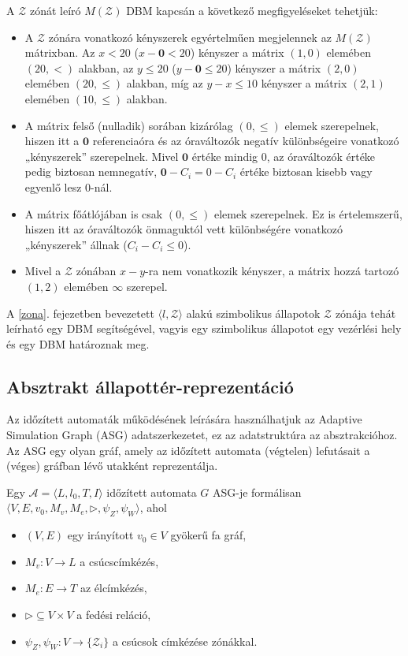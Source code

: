 A $\mathcal{Z}$ zónát leíró $M(\mathcal{Z})$ DBM kapcsán a következő megfigyeléseket tehetjük:
\begin{itemize}
    \item A $\mathcal{Z}$ zónára vonatkozó kényszerek egyértelműen megjelennek az $M(\mathcal{Z})$ mátrixban. Az $x < 20$ ($x - \textbf{0} < 20$) kényszer a mátrix $(1,0)$ elemében $(20,<)$ alakban, az $y \leq 20$ ($y - \textbf{0} \leq 20$) kényszer a mátrix $(2,0)$ elemében $(20,\leq)$ alakban, míg az $y-x \leq 10$ kényszer a mátrix $(2,1)$ elemében $(10,\leq)$ alakban.
    \item A mátrix felső (nulladik) sorában kizárólag $(0,\leq)$ elemek szerepelnek, hiszen itt a $\textbf{0}$ referenciaóra és az óraváltozók negatív különbségeire vonatkozó „kényszerek” szerepelnek. Mivel $\textbf{0}$ értéke mindig 0, az óraváltozók értéke pedig biztosan nemnegatív, $\textbf{0}-C_i = 0-C_i$ értéke biztosan kisebb vagy egyenlő lesz 0-nál.
    \item A mátrix főátlójában is csak $(0,\leq)$ elemek szerepelnek. Ez is értelemszerű, hiszen itt az óraváltozók önmaguktól vett különbségére vonatkozó „kényszerek” állnak ($C_i - C_i \leq 0$).
    \item Mivel a $\mathcal{Z}$ zónában $x-y$-ra nem vonatkozik kényszer, a mátrix hozzá tartozó $(1,2)$ elemében $\infty$ szerepel.
\end{itemize}

A \ref{zona}. fejezetben bevezetett $\langle l, \mathcal{Z} \rangle$ alakú szimbolikus állapotok $\mathcal{Z}$ zónája tehát leírható egy DBM segítségével, vagyis egy szimbolikus állapotot egy vezérlési hely és egy DBM határoznak meg.

\subsection{Absztrakt állapottér-reprezentáció}
Az időzített automaták működésének leírására használhatjuk az Adaptive Simulation Graph (ASG) \cite{spin2018} adatszerkezetet, ez az adatstruktúra az absztrakcióhoz. Az ASG egy olyan gráf, amely az időzített automata (végtelen) lefutásait a (véges) gráfban lévő utakként reprezentálja.
\begin{definition}
\label{def:ASG}
Egy $\mathcal{A} = \langle L,l_0,T,I\rangle$ időzített automata $G$ ASG-je formálisan $\langle V, E, v_0, M_v, M_e, \rhd, \psi_Z, \psi_W \rangle$, ahol
\begin{itemize}
    \item $(V, E)$ egy irányított $v_0 \in V$ gyökerű fa gráf,
    \item $M_v: V \rightarrow L$ a csúcscímkézés,
    \item $M_e: E \rightarrow T$ az élcímkézés,
    \item $\rhd \subseteq V \times V$ a fedési reláció,
    \item $\psi_Z, \psi_W: V \rightarrow \{ \mathcal{Z}_i \}$ a csúcsok címkézése zónákkal.
\end{itemize}
\end{definition}


